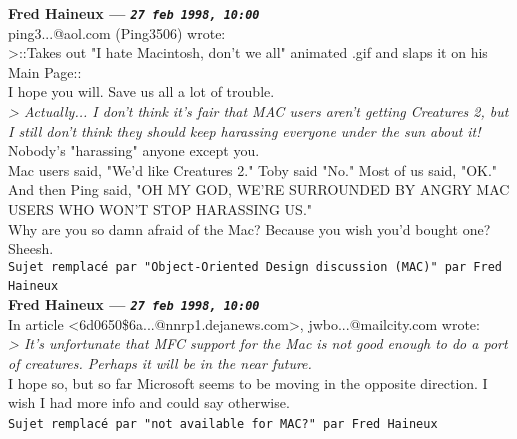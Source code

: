 \documentclass[11pt,twoside,a4paper]{article}
\begin{document}
\begin{multicols*}{2}
 
		
	
		
\textbf{Fred Haineux --- \emph{\texttt{27 feb 1998, 10:00}}}~\\

ping3...@aol.com (Ping3506) wrote:~\\
>::Takes out "I hate Macintosh, don't we all" animated .gif and slaps it on his Main Page::~\\

I hope you will. Save us all a lot of trouble.~\\

\emph{> Actually... I don't think it's fair that MAC users aren't getting Creatures 2, but I still don't think they should keep harassing everyone under the sun about it!}~\\

Nobody's "harassing" anyone except you.~\\

Mac users said, "We'd like Creatures 2." Toby said "No." Most of us said, "OK."~\\

And then Ping said, "OH MY GOD, WE'RE SURROUNDED BY ANGRY MAC USERS WHO WON'T STOP HARASSING US."~\\

Why are you so damn afraid of the Mac? Because you wish you'd bought one? Sheesh.~\\



\texttt{Sujet remplac{\'e} par "Object-Oriented Design discussion (MAC)" par Fred Haineux}~\\
	
		
\textbf{Fred Haineux --- \emph{\texttt{27 feb 1998, 10:00}}}~\\

In article <6d0650\$6a...@nnrp1.dejanews.com>, jwbo...@mailcity.com wrote:~\\
\emph{> It's unfortunate that MFC support for the Mac is not good enough to do a port of creatures. Perhaps it will be in the near future.}~\\

I hope so, but so far Microsoft seems to be moving in the opposite direction. I wish I had more info and could say otherwise.~\\

 
		
	
		
\texttt{Sujet remplac{\'e} par "not available for MAC?" par Fred Haineux}~\\


\end{multicols*}
\end{document}
